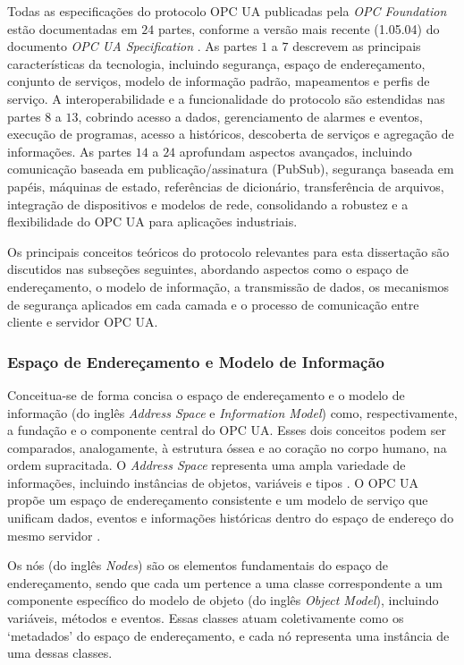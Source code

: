         Todas as especificações do protocolo OPC UA publicadas pela \textit{OPC Foundation} estão documentadas em $24$ partes, conforme a versão mais recente (1.05.04) do documento \textit{OPC UA Specification} \cite{opc2024}. As partes $1$ a $7$ descrevem as principais características da tecnologia, incluindo segurança, espaço de endereçamento, conjunto de serviços, modelo de informação padrão, mapeamentos e perfis de serviço. A interoperabilidade e a funcionalidade do protocolo são estendidas nas partes $8$ a $13$, cobrindo acesso a dados, gerenciamento de alarmes e eventos, execução de programas, acesso a históricos, descoberta de serviços e agregação de informações. As partes $14$ a $24$ aprofundam aspectos avançados, incluindo comunicação baseada em publicação/assinatura (PubSub), segurança baseada em papéis, máquinas de estado, referências de dicionário, transferência de arquivos, integração de dispositivos e modelos de rede, consolidando a robustez e a flexibilidade do OPC UA para aplicações industriais.

        Os principais conceitos teóricos do protocolo relevantes para esta dissertação são discutidos nas subseções seguintes, abordando aspectos como o espaço de endereçamento, o modelo de informação, a transmissão de dados, os mecanismos de segurança aplicados em cada camada e o processo de comunicação entre cliente e servidor OPC UA.

    \subsubsection{Espaço de Endereçamento e Modelo de Informação}

        Conceitua-se de forma concisa o espaço de endereçamento e o modelo de informação (do inglês \textit{Address Space} e \textit{Information Model}) como, respectivamente, a fundação e o componente central do OPC UA. Esses dois conceitos podem ser comparados, analogamente, à estrutura óssea e ao coração no corpo humano, na ordem supracitada. O \textit{Address Space} representa uma ampla variedade de informações, incluindo instâncias de objetos, variáveis e tipos \cite{gong2020}. O OPC UA propõe um espaço de endereçamento consistente e um modelo de serviço que unificam dados, eventos e informações históricas dentro do espaço de endereço do mesmo servidor \cite{ren2019}.

        Os nós (do inglês \textit{Nodes}) são os elementos fundamentais do espaço de endereçamento, sendo que cada um pertence a uma classe correspondente a um componente específico do modelo de objeto (do inglês \textit{Object Model}), incluindo variáveis, métodos e eventos. Essas classes atuam coletivamente como os `metadados' do espaço de endereçamento, e cada nó representa uma instância de uma dessas classes.

